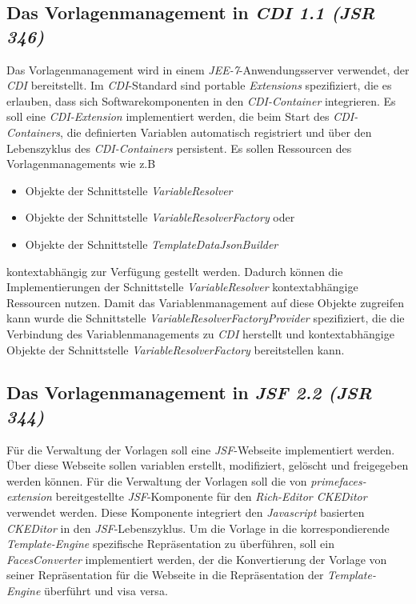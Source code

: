\subsection{Das Vorlagenmanagement in \emph{CDI 1.1 (JSR 346)}}
\label{sec:sub-template-management-cdi}
Das Vorlagenmanagement wird in einem \emph{JEE-7}-Anwendungsserver verwendet, der \emph{CDI} bereitstellt. Im \emph{CDI}-Standard sind portable \emph{Extensions} spezifiziert, die es erlauben, dass sich Softwarekomponenten in den \emph{CDI-Container} integrieren. Es soll eine \emph{CDI-Extension} implementiert werden, die beim Start des \emph{CDI-Containers}, die definierten Variablen automatisch registriert und über den Lebenszyklus des \emph{CDI-Containers} persistent. Es sollen Ressourcen des Vorlagenmanagements wie z.B
\begin{itemize}
	\item Objekte der Schnittstelle \emph{VariableResolver}
	\item Objekte der Schnittstelle \emph{VariableResolverFactory} oder
	\item Objekte der Schnittstelle \emph{TemplateDataJsonBuilder}
\end{itemize}
kontextabhängig zur Verfügung gestellt werden. Dadurch können die Implementierungen der Schnittstelle \emph{VariableResolver} kontextabhängige Ressourcen nutzen. Damit das Variablenmanagement auf diese Objekte zugreifen kann wurde die Schnittstelle \emph{VariableResolverFactoryProvider} spezifiziert, die die Verbindung des Variablenmanagements zu \emph{CDI} herstellt und kontextabhängige Objekte der Schnittstelle \emph{VariableResolverFactory} bereitstellen kann.

\subsection{Das Vorlagenmanagement in \emph{JSF 2.2 (JSR 344)}}
Für die Verwaltung der Vorlagen soll eine \emph{JSF}-Webseite implementiert werden. Über diese Webseite sollen variablen erstellt, modifiziert, gelöscht und freigegeben werden können. Für die Verwaltung der Vorlagen soll die von \emph{primefaces-extension} bereitgestellte \emph{JSF}-Komponente für den \emph{Rich-Editor CKEDitor} verwendet werden. Diese Komponente integriert den \emph{Javascript} basierten \emph{CKEDitor} in den \emph{JSF}-Lebenszyklus. Um die Vorlage in die korrespondierende \emph{Template-Engine} spezifische Repräsentation zu überführen, soll ein \emph{FacesConverter} implementiert werden, der die Konvertierung der Vorlage von seiner Repräsentation für die Webseite in die Repräsentation der \emph{Template-Engine} überführt und visa versa.

